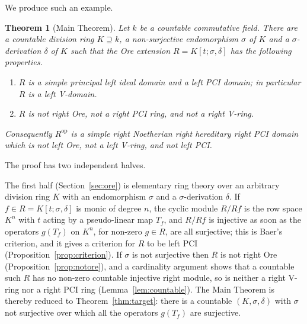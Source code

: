 \documentclass[11pt]{amsart}
\theoremstyle{plain}
\newtheorem{theorem}{Theorem}[section]
\theoremstyle{definition}
\theoremstyle{remark}
\newcommand{\op}{\mathrm{op}}
\begin{document}
We produce such an example.

\begin{theorem}[Main Theorem]\label{thm:main}
Let $k$ be a countable commutative field. There are a countable division ring $K\supseteq k$, a non-surjective endomorphism $\sigma$ of $K$ and a $\sigma$-derivation $\delta$ of $K$ such that the Ore extension $R=K[t;\sigma,\delta]$ has the following properties.
\begin{enumerate}
\item $R$ is a simple principal left ideal domain and a left PCI domain; in particular $R$ is a left V-domain.
\item $R$ is not right Ore, not a right PCI ring, and not a right V-ring.
\end{enumerate}
Consequently $R^{\op}$ is a simple right Noetherian right hereditary right PCI domain which is not left Ore, not a left V-ring, and not left PCI.
\end{theorem}

The proof has two independent halves.

The first half (Section~\ref{sec:ore}) is elementary ring theory over an arbitrary division ring $K$ with an endomorphism $\sigma$ and a $\sigma$-derivation $\delta$. If $f\in R=K[t;\sigma,\delta]$ is monic of degree $n$, the cyclic module $R/Rf$ is the row space $K^n$ with $t$ acting by a pseudo-linear map $T_f$, and $R/Rf$ is injective as soon as the operators $g(T_f)$ on $K^n$, for non-zero $g\in R$, are all surjective; this is Baer's criterion, and it gives a criterion for $R$ to be left PCI (Proposition~\ref{prop:criterion}). If $\sigma$ is not surjective then $R$ is not right Ore (Proposition~\ref{prop:notore}), and a cardinality argument shows that a countable such $R$ has no non-zero countable injective right module, so is neither a right V-ring nor a right PCI ring (Lemma~\ref{lem:countable}). The Main Theorem is thereby reduced to Theorem~\ref{thm:target}: there is a countable $(K,\sigma,\delta)$ with $\sigma$ not surjective over which all the operators $g(T_f)$ are surjective.
\end{document}
